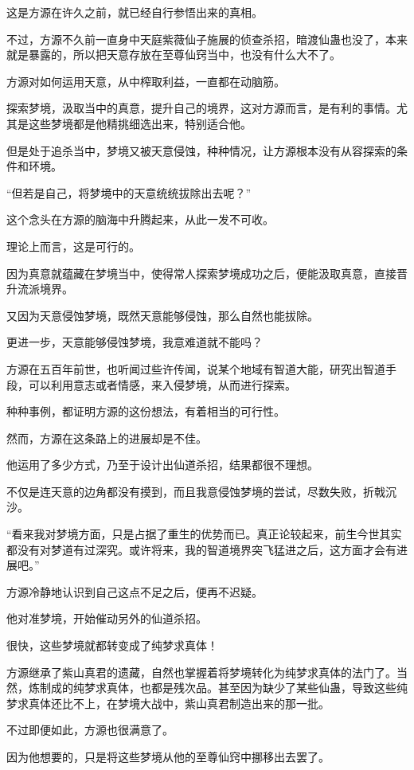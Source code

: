 \begin{this_body}
这是方源在许久之前，就已经自行参悟出来的真相。

不过，方源不久前一直身中天庭紫薇仙子施展的侦查杀招，暗渡仙蛊也没了，本来就是暴露的，所以把天意存放在至尊仙窍当中，也没有什么大不了。

方源对如何运用天意，从中榨取利益，一直都在动脑筋。

探索梦境，汲取当中的真意，提升自己的境界，这对方源而言，是有利的事情。尤其是这些梦境都是他精挑细选出来，特别适合他。

但是处于追杀当中，梦境又被天意侵蚀，种种情况，让方源根本没有从容探索的条件和环境。

“但若是自己，将梦境中的天意统统拔除出去呢？”

这个念头在方源的脑海中升腾起来，从此一发不可收。

理论上而言，这是可行的。

因为真意就蕴藏在梦境当中，使得常人探索梦境成功之后，便能汲取真意，直接晋升流派境界。

又因为天意侵蚀梦境，既然天意能够侵蚀，那么自然也能拔除。

更进一步，天意能够侵蚀梦境，我意难道就不能吗？

方源在五百年前世，也听闻过些许传闻，说某个地域有智道大能，研究出智道手段，可以利用意志或者情感，来入侵梦境，从而进行探索。

种种事例，都证明方源的这份想法，有着相当的可行性。

然而，方源在这条路上的进展却是不佳。

他运用了多少方式，乃至于设计出仙道杀招，结果都很不理想。

不仅是连天意的边角都没有摸到，而且我意侵蚀梦境的尝试，尽数失败，折戟沉沙。

“看来我对梦境方面，只是占据了重生的优势而已。真正论较起来，前生今世其实都没有对梦道有过深究。或许将来，我的智道境界突飞猛进之后，这方面才会有进展吧。”

方源冷静地认识到自己这点不足之后，便再不迟疑。

他对准梦境，开始催动另外的仙道杀招。

很快，这些梦境就都转变成了纯梦求真体！

方源继承了紫山真君的遗藏，自然也掌握着将梦境转化为纯梦求真体的法门了。当然，炼制成的纯梦求真体，也都是残次品。甚至因为缺少了某些仙蛊，导致这些纯梦求真体还比不上，在梦境大战中，紫山真君制造出来的那一批。

不过即便如此，方源也很满意了。

因为他想要的，只是将这些梦境从他的至尊仙窍中挪移出去罢了。


\end{this_body}
